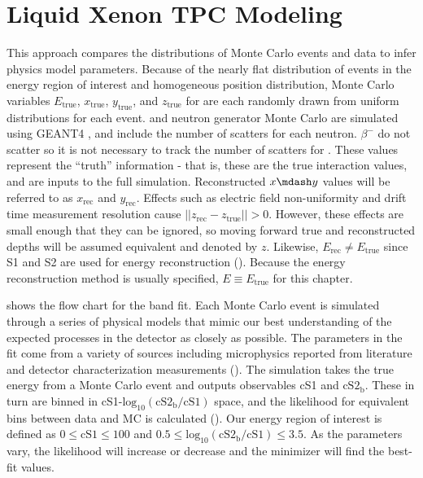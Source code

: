 \section{Liquid Xenon TPC Modeling}
\label{sec:er_nr_calibrations_parameter_determ}
This approach compares the distributions of Monte Carlo events and data to infer physics model parameters.  Because of the nearly flat
distribution of events in the energy
region of interest and homogeneous position distribution, Monte Carlo variables $E_{\mathrm{true}}$, $x_{\mathrm{true}}$,
$y_{\mathrm{true}}$, and $z_{\mathrm{true}}$ for  are each randomly drawn from uniform distributions for each
event.   and
neutron generator Monte Carlo are simulated using GEANT4 , and include the number of
scatters for each neutron.  $\beta^-$ do not scatter so it is not necessary to track the number of scatters for .  These
values represent the ``truth'' information - that is, these are the true interaction values, and are inputs to the full
simulation.  Reconstructed $x \mdash y$ values will be referred to as $x_{\mathrm{rec}}$
and $y_{\mathrm{rec}}$.  Effects such as electric field non-uniformity and drift time measurement resolution cause
$||z_{\mathrm{rec}} - z_{\mathrm{true}}|| > 0$.  However, these effects are small enough that they can be ignored, so moving forward
true and reconstructed depths will be assumed equivalent and denoted by $z$.  Likewise,
$E_{\mathrm{rec}} \neq E_{\mathrm{true}}$ since S1 and S2 are used for energy reconstruction
().  Because the energy reconstruction method is usually specified, $E \equiv E_{\mathrm{true}}$ for
this chapter.

 shows the flow chart for the band fit.  Each Monte Carlo event is
simulated through a series of physical models that mimic our best understanding of the expected processes in the detector as closely as
possible.  The parameters in the fit come from
a variety of sources including microphysics reported from literature and detector characterization measurements
().  The simulation takes the true energy from a Monte Carlo event and outputs observables cS1 and
$\mathrm{cS2_b}$.  These in turn are binned in cS1-$\mathrm{log_{10}(cS2_b / cS1)}$ space, and the likelihood for equivalent bins
between data and MC is calculated ().  Our energy region of interest is
defined as $0 \leq \mathrm{cS1} \leq 100$ and $0.5 \leq \mathrm{log_{10}(cS2_b / cS1)} \leq 3.5$.  As the parameters vary, the likelihood
will increase or decrease and the minimizer will find the best-fit values.

